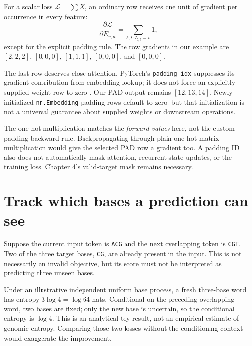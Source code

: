 
For a scalar loss $\mathcal L=\sum X$, an ordinary row receives one unit
of gradient per occurrence in every feature:
\begin{equation}
\frac{\partial\mathcal L}{\partial E_{v,d}}
=\sum_{b,t:I_{b,t}=v}1,
\end{equation}
except for the explicit padding rule. The row gradients in our example
are $[2,2,2]$, $[0,0,0]$, $[1,1,1]$, $[0,0,0]$, and $[0,0,0]$.

The last row deserves close attention. PyTorch's \texttt{padding\_idx}
suppresses its gradient contribution from embedding lookup; it does not
force an explicitly supplied weight row to zero \cite{torch-embedding}.
Our PAD output remains $[12,13,14]$. Newly initialized
\texttt{nn.Embedding} padding rows default to zero, but that initialization
is not a universal guarantee about supplied weights or downstream operations.

The one-hot multiplication matches the \emph{forward values} here, not the
custom padding backward rule. Backpropagating through plain one-hot matrix
multiplication would give the selected PAD row a gradient too. A padding
ID also does not automatically mask attention, recurrent state updates, or
the training loss. Chapter 4's valid-target mask remains necessary.

\section{Track which bases a prediction can see}

Suppose the current input token is \texttt{ACG} and the next overlapping
token is \texttt{CGT}. Two of the three target bases, \texttt{CG}, are
already present in the input. This is not necessarily an invalid objective,
but its score must not be interpreted as predicting three unseen bases.


Under an illustrative independent uniform base process, a fresh three-base
word has entropy $3\log 4=\log64$ nats. Conditional on the preceding
overlapping word, two bases are fixed; only the new base is uncertain, so
the conditional entropy is $\log4$. This is an analytical toy result,
not an empirical estimate of genomic entropy. Comparing those two losses
without the conditioning context would exaggerate the improvement.

